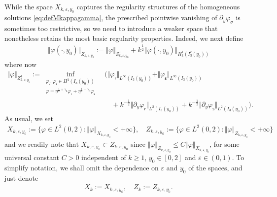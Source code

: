 \documentclass[11pt,reqno]{amsproc}
\theoremstyle{definition}
\numberwithin{equation}{section}
\newcommand{\sr}{{\mathsf{r}}}
\newcommand{\s}{{\mathsf{s}}}
\newcommand{\ep}{\varepsilon}
\begin{document}
While the space $X_{k,\ep,y_0}$ captures the regularity structures of the homogeneous solutions \eqref{eq:defMkappagamma}, the prescribed pointwise vanishing of $\partial_y\varphi_\sigma$ is sometimes too restrictive, so  we need to introduce a weaker space that nonetheless retains the most basic regularity properties. Indeed, we next define 
\begin{align*}
\Vert \varphi(\cdot, y_0) \Vert_{Z_{k,\ep,y_0}} := \Vert \varphi \Vert_{Z_{k,\ep,y_0}^1}  + k^\frac12\Vert \varphi(\cdot, y_0) \Vert_{H^1_k(I_3^c(y_0))} 
\end{align*}
where now
\begin{align*}
\Vert \varphi \Vert_{Z_{k,\ep,y_0}^1}:=\inf_{\substack{\varphi_\sr, \varphi_\s \in H^1(I_3(y_0)) \\  \varphi = \eta^{\frac12+\gamma_0}\varphi_\sr + \eta^{\frac12-\gamma_0}\varphi_\s }} &\Big( \Vert \varphi_\sr\Vert_{L^{\infty}(I_3(y_0))} + \Vert  \varphi_\s\Vert_{L^{\infty}(I_3(y_0))} \\
&\quad + k^{-\frac12}\Vert \partial_y\varphi_\sr\Vert_{L^{2}(I_3(y_0))} + k^{-\frac12}\Vert  \partial_y\varphi_\s\Vert_{L^{2}(I_3(y_0))} \Big).
\end{align*}
As usual, we set
\begin{align*}
X_{k,\ep,y_0} := \lbrace \varphi	\in L^2(0,2) : \Vert \varphi \Vert_{X_{k,\ep,y_0}} < +\infty \rbrace, \quad Z_{k,\ep,y_0} := \lbrace \varphi	\in L^2(0,2) : \Vert \varphi \Vert_{Z_{k,\ep,y_0}} < +\infty \rbrace
\end{align*}
and we readily note that $X_{k,\ep,y_0}\subset Z_{k,\ep,y_0}$ since $\Vert \varphi \Vert_{Z_{k,\ep,y_0}} \leq C\Vert \varphi \Vert_{X_{k,\ep,y_0}}$, for some universal constant $C>0$ independent of $k\geq 1$, $y_0\in[0,2]$ and $\ep\in (0,1)$. To simplify notation, we shall omit the dependence on $\ep$ and $y_0$ of the spaces, and just denote
\begin{align*}
X_k := X_{k,\ep,y_0}, \quad Z_k := Z_{k,\ep,y_0}.
\end{align*}
\end{document}
